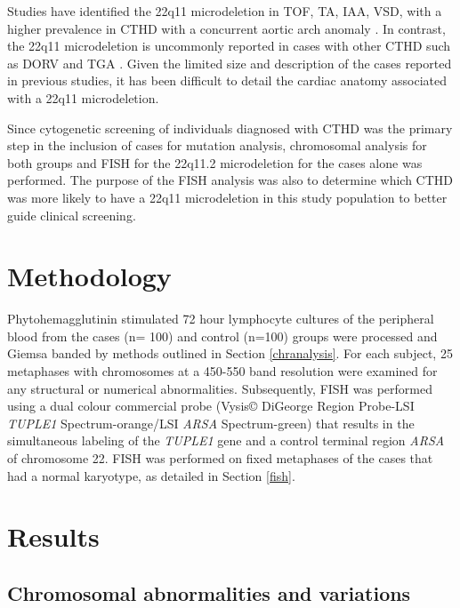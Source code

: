 \begin{refsection}
Studies have identified the 22q11 microdeletion in TOF, TA, IAA, VSD, with a higher prevalence in CTHD with a concurrent aortic arch anomaly \cite{volpe200322q11, momma2010cardiovascular, park2007cardiovascular, ziolkowska2008chromosome, mcdonald2008genetic, mcelhinney2003chromosome, mcelhinney2001association, goldmuntz1998frequency}. In contrast, the 22q11 microdeletion is uncommonly reported in cases with other CTHD such as DORV and TGA \cite{momma2010cardiovascular, goldmuntz1998frequency, van2011changing}. Given the limited size and description of the cases reported in previous studies, it has been difficult to detail the cardiac anatomy associated with a 22q11 microdeletion. 

Since cytogenetic screening of individuals diagnosed with CTHD was the primary step in the inclusion of cases for mutation analysis, chromosomal analysis for both groups and FISH for the 22q11.2 microdeletion for the cases alone was performed. The purpose of the FISH analysis was also to determine which CTHD was more likely to have a 22q11 microdeletion in this study population to better guide clinical screening.



\section{Methodology}
Phytohemagglutinin stimulated 72 hour lymphocyte cultures of the peripheral blood from the cases (n= 100) and control (n=100) groups were processed and Giemsa banded by methods outlined in Section \ref{chranalysis}. For each subject, 25 metaphases with chromosomes at a 450-550 band resolution were examined for any structural or numerical abnormalities. 
Subsequently, FISH was performed using a dual colour commercial probe (Vysis© DiGeorge Region Probe-LSI \textit{TUPLE1} Spectrum-orange/LSI \textit{ARSA} Spectrum-green) that results in the simultaneous labeling of the \textit{TUPLE1} gene and a control terminal region \textit{ARSA} of chromosome 22. FISH was performed on fixed metaphases of the cases that had a normal karyotype, as detailed in Section \ref{fish}.


\section{Results}

\subsection*{Chromosomal abnormalities and variations}



\end{refsection}
